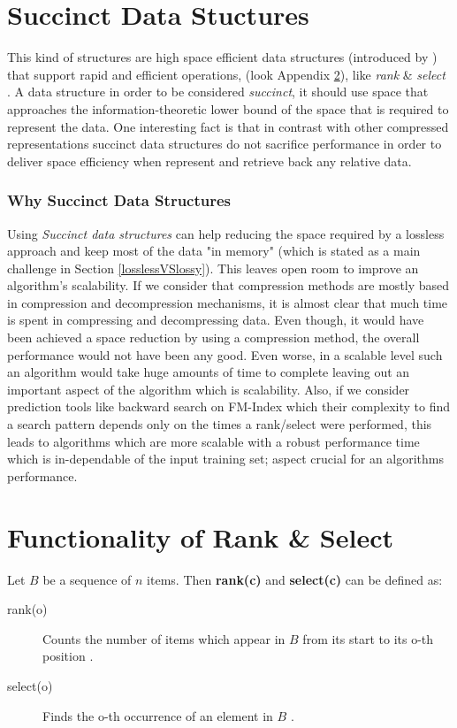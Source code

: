 \newpage
\appendix


\section{Succinct Data Stuctures} \label{App:SDS}
This kind of structures are high space efficient data structures (introduced by \citeauthor{Jacobson89} \citeyear{Jacobson89}) that support rapid and efficient operations, (look Appendix \ref{App:rank_select}), like \emph{rank} \& \emph{select} \cite{dillabaugh_2007, Jacobson89}. A data structure in order to be considered \emph{succinct}, it should use space that approaches the information-theoretic lower bound of the space that is required to represent the data. One interesting fact is that in contrast with other compressed representations succinct data structures do not sacrifice performance in order to deliver space efficiency when represent and retrieve back any relative data. 
\subsubsection{Why Succinct Data Structures}
Using \emph{Succinct data structures} can help reducing the space required by a lossless approach and keep most of the data "in memory" (which is stated as a main challenge in Section \ref{losslessVSlossy}). This leaves open room to improve an algorithm's scalability. If we consider that compression methods are mostly based in compression and decompression mechanisms, it is almost clear that much time is spent in compressing and decompressing data. Even though, it would have been achieved a space reduction by using a compression method, the overall performance would not have been any good. Even worse, in a scalable level such an algorithm would take huge amounts of time to complete leaving out an important aspect of the algorithm which is scalability. Also, if we consider prediction tools like backward search on FM-Index \cite{Ferragina} which their complexity to find a search pattern depends only on the times a rank/select were performed, this leads to algorithms which are more scalable with a robust performance time which is in-dependable of the input training set; aspect crucial for an algorithms performance.



\section{Functionality of Rank \& Select}\label{App:rank_select}
Let \(B\) be a sequence of \(n\) items. Then \textbf{rank(c)} and \textbf{select(c)} can be defined as:
\begin{description}
  \item[rank(o)] 
  Counts the number of items which appear in \(B\) from its start to its o-th position \cite{Jacobson89}.
  \item[select(o)]
  Finds the o-th occurrence of an element in \(B\) \cite{Jacobson89}.
\end{description}

